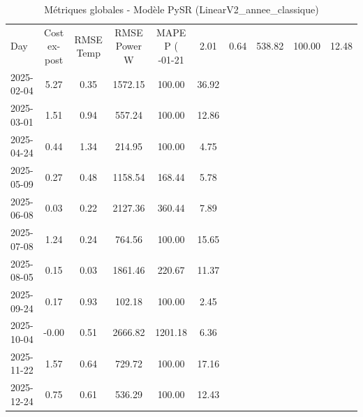 \begin{table}
\caption{Métriques globales - Modèle PySR (LinearV2_annee_classique)}
\label{tab:PySR_LinearV2_annee_classique_Validation_EPlus_sans_Opti}
\begin{small}
\begin{tabular}{lccccc}
\toprule
Day & Cost ex-post & RMSE Temp & RMSE Power W & MAPE P (%
-01-21 & 2.01 & 0.64 & 538.82 & 100.00 & 12.48 \\
2025-02-04 & 5.27 & 0.35 & 1572.15 & 100.00 & 36.92 \\
2025-03-01 & 1.51 & 0.94 & 557.24 & 100.00 & 12.86 \\
2025-04-24 & 0.44 & 1.34 & 214.95 & 100.00 & 4.75 \\
2025-05-09 & 0.27 & 0.48 & 1158.54 & 168.44 & 5.78 \\
2025-06-08 & 0.03 & 0.22 & 2127.36 & 360.44 & 7.89 \\
2025-07-08 & 1.24 & 0.24 & 764.56 & 100.00 & 15.65 \\
2025-08-05 & 0.15 & 0.03 & 1861.46 & 220.67 & 11.37 \\
2025-09-24 & 0.17 & 0.93 & 102.18 & 100.00 & 2.45 \\
2025-10-04 & -0.00 & 0.51 & 2666.82 & 1201.18 & 6.36 \\
2025-11-22 & 1.57 & 0.64 & 729.72 & 100.00 & 17.16 \\
2025-12-24 & 0.75 & 0.61 & 536.29 & 100.00 & 12.43 \\
\bottomrule
\end{tabular}
\end{small}
\end{table}
